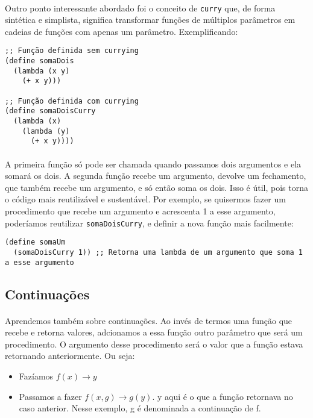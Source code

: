 \documentclass[11pt]{article}
\begin{document}
\paragraph{} Outro ponto interessante abordado foi o conceito de \texttt{curry} que, de forma sintética e simplista, significa transformar funções
de múltiplos parâmetros em cadeias de funções com apenas um parâmetro. Exemplificando:
\begin{verbatim}
;; Função definida sem currying
(define somaDois
  (lambda (x y)
    (+ x y)))

;; Função definida com currying
(define somaDoisCurry
  (lambda (x)
    (lambda (y)
      (+ x y))))
\end{verbatim}

\paragraph{} A primeira função só pode ser chamada quando passamos dois argumentos e ela somará os dois. A segunda função recebe um
argumento, devolve um fechamento, que também recebe um argumento, e só então soma os dois. Isso é útil, pois torna o código mais
reutilizável e sustentável. Por exemplo, se quisermos fazer um procedimento que recebe um argumento e acrescenta 1 a esse argumento,
poderíamos reutilizar \texttt{somaDoisCurry}, e definir a nova função mais facilmente:

\begin{verbatim}
(define somaUm
  (somaDoisCurry 1)) ;; Retorna uma lambda de um argumento que soma 1 a esse argumento
\end{verbatim}

\subsection{Continuações}
\label{sec:orgb813025}
\paragraph{} Aprendemos também sobre continuações. Ao invés de termos uma função que recebe e retorna valores, adcionamos a essa função outro
parâmetro que será um procedimento. O argumento desse procedimento será o valor que a função estava retornando anteriormente. Ou seja:
\begin{itemize}
\item Fazíamos \(f(x) \rightarrow y\)
\item Passamos a fazer \(f(x, g) \rightarrow g(y)\). y aqui é o que a função retornava no caso anterior. Nesse exemplo, g é denominada a continuação de f.
\end{itemize}
\end{document}
